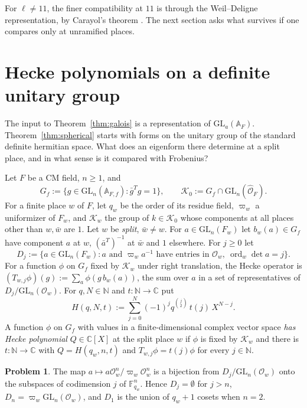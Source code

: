 \documentclass[reqno]{amsart}
\theoremstyle{definition}
\newtheorem{problem}{Problem}[section]
\theoremstyle{plain}
\newcommand{\C}{\mathbb{C}}
\newcommand{\F}{\mathbb{F}}
\newcommand{\A}{\mathbb{A}}
\newcommand{\Oc}{\mathcal{O}}
\newcommand{\Kc}{\mathcal{K}}
\newcommand{\GL}{\mathrm{GL}}
\newcommand{\ord}{\operatorname{ord}}
\begin{document}
For \(\ell \ne 11\), the finer compatibility at \(11\) is through the Weil--Deligne representation, by Carayol's theorem \cite{Ca}.  The next section asks what survives if one compares only at unramified places.

\section{Hecke polynomials on a definite unitary group}\label{sec:spherical}

The input to Theorem~\ref{thm:galois} is a representation of \(\GL_a(\A_F)\).  Theorem~\ref{thm:spherical} starts with forms on the unitary group of the standard definite hermitian space.  What does an eigenform there determine at a split place, and in what sense is it compared with Frobenius?

Let \(F\) be a CM field, \(n \ge 1\), and
\[
  G_f := \{ g \in \GL_n(\A_{F,f}) : \bar g^{T} g = 1 \}, \qquad \Kc_0 := G_f \cap \GL_n(\widehat{\Oc}_F).
\]
For a finite place \(w\) of \(F\), let \(q_w\) be the order of its residue field, \(\varpi_w\) a uniformizer of \(F_w\), and \(\Kc_w\) the group of \(k \in \Kc_0\) whose components at all places other than \(w, \bar w\) are \(1\).  Let \(w\) be \emph{split}, \(\bar w \ne w\).  For \(a \in \GL_n(F_w)\) let \(b_w(a) \in G_f\) have component \(a\) at \(w\), \((\bar a^T)^{-1}\) at \(\bar w\) and \(1\) elsewhere.  For \(j \ge 0\) let
\[
  D_j := \{ a \in \GL_n(F_w) : a \text{ and } \varpi_w a^{-1} \text{ have entries in } \Oc_w,\ \ord_w \det a = j \} .
\]
For a function \(\phi\) on \(G_f\) fixed by \(\Kc_w\) under right translation, the Hecke operator is \((T_{w,j}\phi)(g) := \sum_{a} \phi(g\, b_w(a))\), the sum over \(a\) in a set of representatives of \(D_j/\GL_n(\Oc_w)\).  For \(q, N \in \mathbb{N}\) and \(t \colon \mathbb{N} \to \C\) put
\[
  H(q, N, t) := \sum_{j=0}^{N} (-1)^j q^{\binom{j}{2}}\, t(j)\, X^{N-j} .
\]
A function \(\phi\) on \(G_f\) with values in a finite-dimensional complex vector space \emph{has Hecke polynomial} \(Q \in \C[X]\) at the split place \(w\) if \(\phi\) is fixed by \(\Kc_w\) and there is \(t \colon \mathbb{N} \to \C\) with \(Q = H(q_w, n, t)\) and \(T_{w,j}\phi = t(j)\phi\) for every \(j \in \mathbb{N}\).

\begin{problem}\label{pr:cosets}
The map \(a \mapsto a\Oc_w^n/\varpi_w\Oc_w^n\) is a bijection from \(D_j/\GL_n(\Oc_w)\) onto the subspaces of codimension \(j\) of \(\F_{q_w}^n\).  Hence \(D_j = \emptyset\) for \(j > n\), \(D_n = \varpi_w\GL_n(\Oc_w)\), and \(D_1\) is the union of \(q_w + 1\) cosets when \(n = 2\).
\end{problem}
\end{document}
